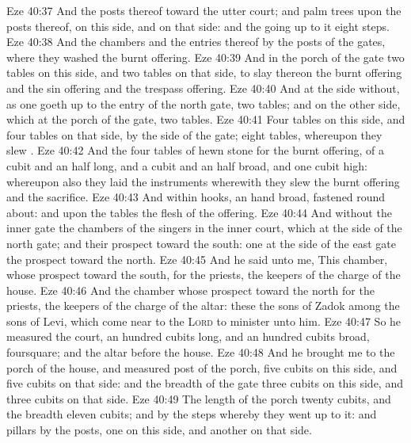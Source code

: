 \vs Eze 40:37 And the posts thereof  toward the utter court; and palm trees  upon the posts thereof, on this side, and on that side: and the going up to it  eight steps.
\vs Eze 40:38 And the chambers and the entries thereof  by the posts of the gates, where they washed the burnt offering.
\vs Eze 40:39 And in the porch of the gate  two tables on this side, and two tables on that side, to slay thereon the burnt offering and the sin offering and the trespass offering.
\vs Eze 40:40 And at the side without, as one goeth up to the entry of the north gate,  two tables; and on the other side, which  at the porch of the gate,  two tables.
\vs Eze 40:41 Four tables  on this side, and four tables on that side, by the side of the gate; eight tables, whereupon they slew .
\vs Eze 40:42 And the four tables  of hewn stone for the burnt offering, of a cubit and an half long, and a cubit and an half broad, and one cubit high: whereupon also they laid the instruments wherewith they slew the burnt offering and the sacrifice.
\vs Eze 40:43 And within  hooks, an hand broad, fastened round about: and upon the tables  the flesh of the offering.
\vs Eze 40:44 And without the inner gate  the chambers of the singers in the inner court, which  at the side of the north gate; and their prospect  toward the south: one at the side of the east gate  the prospect toward the north.
\vs Eze 40:45 And he said unto me, This chamber, whose prospect  toward the south,  for the priests, the keepers of the charge of the house.
\vs Eze 40:46 And the chamber whose prospect  toward the north  for the priests, the keepers of the charge of the altar: these  the sons of Zadok among the sons of Levi, which come near to the \textsc{Lord} to minister unto him.
\vs Eze 40:47 So he measured the court, an hundred cubits long, and an hundred cubits broad, foursquare; and the altar  before the house.
\vs Eze 40:48 And he brought me to the porch of the house, and measured  post of the porch, five cubits on this side, and five cubits on that side: and the breadth of the gate  three cubits on this side, and three cubits on that side.
\vs Eze 40:49 The length of the porch  twenty cubits, and the breadth eleven cubits; and  by the steps whereby they went up to it: and  pillars by the posts, one on this side, and another on that side.
